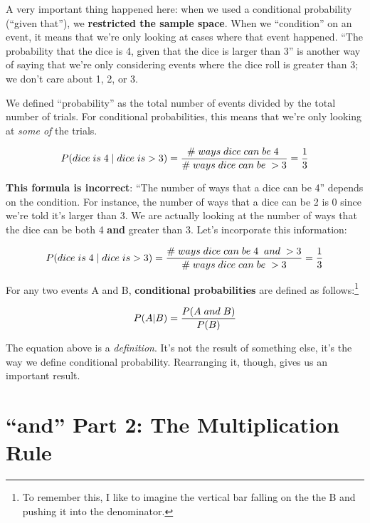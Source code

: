 \documentclass[
  letterpaper,
  DIV=11,
  numbers=noendperiod]{scrreprt}
\begin{document}
A very important thing happened here: when we used a conditional
probability (``given that''), we \textbf{restricted the sample space}.
When we ``condition'' on an event, it means that we're only looking at
cases where that event happened. ``The probability that the dice is 4,
given that the dice is larger than 3'' is another way of saying that
we're only considering events where the dice roll is greater than 3; we
don't care about 1, 2, or 3.

We defined ``probability'' as the total number of events divided by the
total number of trials. For conditional probabilities, this means that
we're only looking at \emph{some of} the trials.

\begin{align*}
\small P(dice\; is\; 4\; |\; dice\; is >3) = \frac{\#\; ways\;dice\;can\;be\;4\;}{\#\;ways\;dice\;can\;be\;>3}=\frac{1}{3}
\end{align*}

\textbf{This formula is incorrect}: ``The number of ways that a dice can
be 4'' depends on the condition. For instance, the number of ways that a
dice can be 2 is 0 since we're told it's larger than 3. We are actually
looking at the number of ways that the dice can be both 4 \textbf{and}
greater than 3. Let's incorporate this information:

\begin{align*}
\small P(dice\; is\; 4\; |\; dice\; is >3) = \frac{\#\; ways\;dice\;can\;be\;4\;\;and\;>3}{\#\;ways\;dice\;can\;be\;>3}=\frac{1}{3}
\end{align*}

For any two events A and B, \textbf{conditional probabilities} are
defined as follows:\footnote{To remember this, I like to imagine the
  vertical bar falling on the the B and pushing it into the denominator.}

\begin{align*}
\small P(A | B) = \frac{P(A\;and\; B)}{P(B)}
\end{align*}

The equation above is a \emph{definition}. It's not the result of
something else, it's the way we define conditional probability.
Rearranging it, though, gives us an important result.

\hypertarget{and-part-2-the-multiplication-rule}{%
\section{``and'' Part 2: The Multiplication
Rule}\label{and-part-2-the-multiplication-rule}}
\end{document}
